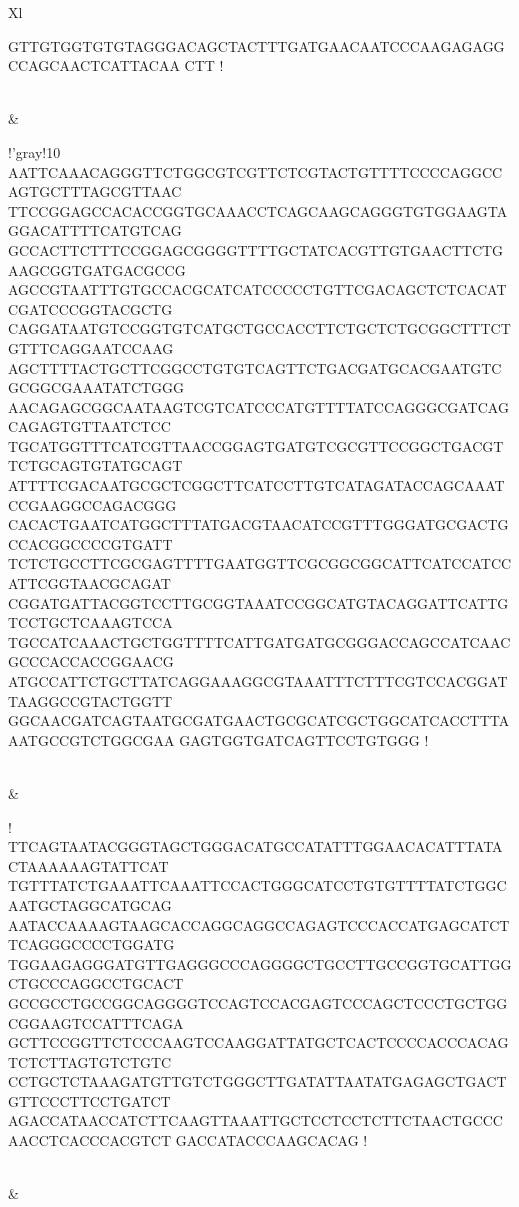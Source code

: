 \begin{xltabular}{\textwidth}{Xl}
\begin{minipage}{.85\textwidth}
				GTTGTGGTGTGTAGGGACAGCTACTTTGATGAACAATCCCAAGAGAGGCCAGCAACTCATTACAA
				CTT
			!
			\vspace*{4pt}
		\end{minipage}
	\\
	 & 
		\begin{minipage}{.85\textwidth}
			\vspace*{4pt}
			\DNA!'{gray!10}
				AATTCAAACAGGGTTCTGGCGTCGTTCTCGTACTGTTTTCCCCAGGCCAGTGCTTTAGCGTTAAC
				TTCCGGAGCCACACCGGTGCAAACCTCAGCAAGCAGGGTGTGGAAGTAGGACATTTTCATGTCAG
				GCCACTTCTTTCCGGAGCGGGGTTTTGCTATCACGTTGTGAACTTCTGAAGCGGTGATGACGCCG
				AGCCGTAATTTGTGCCACGCATCATCCCCCTGTTCGACAGCTCTCACATCGATCCCGGTACGCTG
				CAGGATAATGTCCGGTGTCATGCTGCCACCTTCTGCTCTGCGGCTTTCTGTTTCAGGAATCCAAG
				AGCTTTTACTGCTTCGGCCTGTGTCAGTTCTGACGATGCACGAATGTCGCGGCGAAATATCTGGG
				AACAGAGCGGCAATAAGTCGTCATCCCATGTTTTATCCAGGGCGATCAGCAGAGTGTTAATCTCC
				TGCATGGTTTCATCGTTAACCGGAGTGATGTCGCGTTCCGGCTGACGTTCTGCAGTGTATGCAGT
				ATTTTCGACAATGCGCTCGGCTTCATCCTTGTCATAGATACCAGCAAATCCGAAGGCCAGACGGG
				CACACTGAATCATGGCTTTATGACGTAACATCCGTTTGGGATGCGACTGCCACGGCCCCGTGATT
				TCTCTGCCTTCGCGAGTTTTGAATGGTTCGCGGCGGCATTCATCCATCCATTCGGTAACGCAGAT
				CGGATGATTACGGTCCTTGCGGTAAATCCGGCATGTACAGGATTCATTGTCCTGCTCAAAGTCCA
				TGCCATCAAACTGCTGGTTTTCATTGATGATGCGGGACCAGCCATCAACGCCCACCACCGGAACG
				ATGCCATTCTGCTTATCAGGAAAGGCGTAAATTTCTTTCGTCCACGGATTAAGGCCGTACTGGTT
				GGCAACGATCAGTAATGCGATGAACTGCGCATCGCTGGCATCACCTTTAAATGCCGTCTGGCGAA
				GAGTGGTGATCAGTTCCTGTGGG
			!
			\vspace*{4pt}
		\end{minipage}
	\\
	 & 
		\begin{minipage}{.85\textwidth}
			\vspace*{4pt}
			\DNA!
				TTCAGTAATACGGGTAGCTGGGACATGCCATATTTGGAACACATTTATACTAAAAAAGTATTCAT
				TGTTTATCTGAAATTCAAATTCCACTGGGCATCCTGTGTTTTATCTGGCAATGCTAGGCATGCAG
				AATACCAAAAGTAAGCACCAGGCAGGCCAGAGTCCCACCATGAGCATCTTCAGGGCCCCTGGATG
				TGGAAGAGGGATGTTGAGGGCCCAGGGGCTGCCTTGCCGGTGCATTGGCTGCCCAGGCCTGCACT
				GCCGCCTGCCGGCAGGGGTCCAGTCCACGAGTCCCAGCTCCCTGCTGGCGGAAGTCCATTTCAGA
				GCTTCCGGTTCTCCCAAGTCCAAGGATTATGCTCACTCCCCACCCACAGTCTCTTAGTGTCTGTC
				CCTGCTCTAAAGATGTTGTCTGGGCTTGATATTAATATGAGAGCTGACTGTTCCCTTCCTGATCT
				AGACCATAACCATCTTCAAGTTAAATTGCTCCTCCTCTTCTAACTGCCCAACCTCACCCACGTCT
				GACCATACCCAAGCACAG
			!
			\vspace*{4pt}
		\end{minipage}
	\\
	 & 

\end{xltabular}
